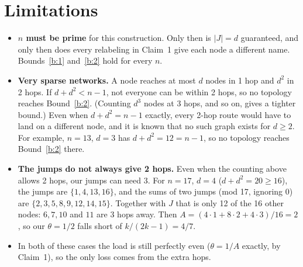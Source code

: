 \documentclass[11pt]{article}
\theoremstyle{definition}
\begin{document}
\section{Limitations}\label{sec:lim}
\begin{itemize}
\item \textbf{$n$ must be prime} for this construction. Only then is $|J| = d$ guaranteed, and only then does every
  relabeling in Claim~1 give each node a different name. Bounds~\ref{b:1} and~\ref{b:2} hold for every $n$.
\item \textbf{Very sparse networks.} A node reaches at most $d$ nodes in 1 hop and $d^2$ in 2 hops. If
  $d + d^2 < n-1$, not everyone can be within 2 hops, so no topology reaches Bound~\ref{b:2}. (Counting $d^3$ nodes at
  3 hops, and so on, gives a tighter bound.) Even when $d + d^2 = n-1$ exactly, every 2-hop route would have to land
  on a different node, and it is known that no such graph exists for $d \ge 2$. For example, $n=13$, $d=3$ has
  $d+d^2 = 12 = n-1$, so no topology reaches Bound~\ref{b:2} there.
\item \textbf{The jumps do not always give 2 hops.} Even when the counting above allows 2 hops, our jumps can need 3.
  For $n=17$, $d=4$ ($d+d^2 = 20 \ge 16$), the jumps are $\{1,4,13,16\}$, and the sums of two jumps (mod 17, ignoring
  $0$) are $\{2,3,5,8,9,12,14,15\}$. Together with $J$ that is only 12 of the 16 other nodes: $6, 7, 10$ and $11$ are
  3 hops away. Then $A = (4\cdot1 + 8\cdot2 + 4\cdot3)/16 = 2$, so our $\theta = 1/2$ falls short of $k/(2k-1) = 4/7$.
\item In both of these cases the load is still perfectly even ($\theta = 1/A$ exactly, by Claim~1), so the only loss
  comes from the extra hops.
\end{itemize}
\end{document}
